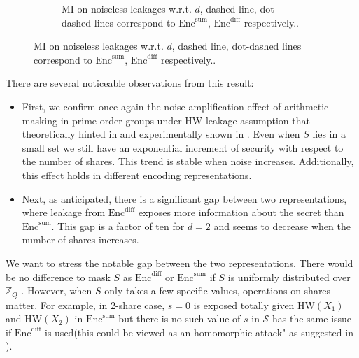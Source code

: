 \documentclass{llncs}
\begin{document}
\begin{figure}[h]
\begin{subfigure}{0.5\textwidth}
			\caption{MI on noiseless leakages w.r.t. $d$, dashed line, dot-dashed lines correspond to $\text{Enc}^{\text{sum}}$, $\text{Enc}^{\text{diff}}$ respectively..}\label{fig:milines}
		\end{subfigure}
		\label{fig:image2}
	\end{figure}
	
	There are several noticeable observations from this result:
	\begin{itemize}
		\item First, we confirm once again the noise amplification effect of arithmetic masking in prime-order groups under HW leakage assumption that theoretically hinted in \cite{optimalmask} and experimentally shown in \cite{primemask}. Even when $S$ lies in a small set we still have an exponential increment of security with respect to the number of shares. This trend is stable when noise increases. Additionally, this effect holds in different encoding representations. 
		\item Next, as anticipated, there is a significant gap between two representations, where leakage from $\text{Enc}^{\text{diff}}$ exposes more information about the secret than $\text{Enc}^{\text{sum}}$. This gap is a factor of ten for $d=2$ and seems to decrease when the number of shares increases.
	\end{itemize}
	We want to stress the notable gap between the two representations. There would be no difference to mask $S$ as $\text{Enc}^{\text{diff}}$  or $\text{Enc}^{\text{sum}}$  if $S$ is uniformly distributed over $\mathbb{Z}_Q$ . However, when $S$ only takes a few specific values, operations on shares matter. For example, in 2-share case, $s=0$ is exposed totally given $\text{HW}(X_1)$ and $\text{HW}(X_2)$ in  $\text{Enc}^{\text{sum}}$ but there is no such value of $s$ in $\mathcal{S}$ has the same issue if $\text{Enc}^{\text{diff}}$ is used(this could be viewed as an homomorphic attack" as suggested in \cite{optimalmask}).
	
\end{document}
